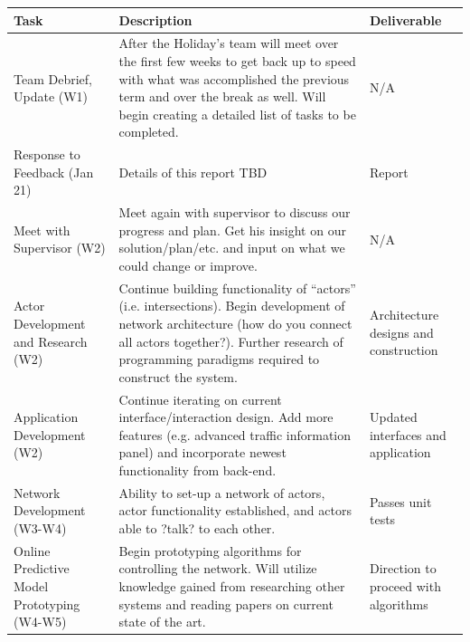 \documentclass{article}
\begin{document}
\begin{longtable}{|p{4.5cm}|p{6cm}|p{4.5cm}|} \hline
    Task                                              & Description                                                                                                & Deliverable                           \\ \hline
    Team Debrief, Update (W1)                         & After the Holiday's team will meet over the first few weeks to get back up to speed with what was accomplished the previous term and over the break as well. Will begin creating a detailed list of tasks to be completed.         & N/A                                   \\ \hline
    Response to Feedback (Jan 21)                     & Details of this report TBD                                                                                                                                                                                                         & Report                                \\ \hline
    Meet with Supervisor (W2)                         & Meet again with supervisor to discuss our progress and plan. Get his insight on our solution/plan/etc. and input on what we could change or improve.                                                                               & N/A                                   \\ \hline
    Actor Development and Research (W2)               & Continue building functionality of ``actors'' (i.e. intersections). Begin development of network architecture (how do you connect all actors together?). Further research of programming paradigms required to construct the system. & Architecture designs and construction \\ \hline
    Application Development (W2)                      & Continue iterating on current interface/interaction design. Add more features (e.g. advanced traffic information panel) and incorporate newest functionality from back-end.                                                        & Updated interfaces and application    \\ \hline
    Network Development (W3-W4)                       & Ability to set-up a network of actors, actor functionality established, and actors able to ?talk? to each other.                                                                                                                   & Passes unit tests                     \\ \hline
    Online Predictive Model Prototyping (W4-W5)       & Begin prototyping algorithms for controlling the network. Will utilize knowledge gained from researching other systems and reading papers on current state of the art.                                                             & Direction to proceed with algorithms  \\ \hline

\end{longtable}
\end{document}
